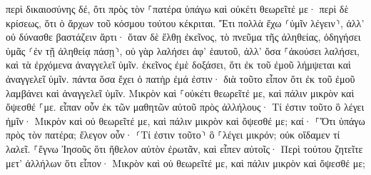 \documentclass{openreader}
\begin{document}
περὶ δικαιοσύνης δέ, ὅτι πρὸς τὸν ⸀πατέρα ὑπάγω καὶ οὐκέτι θεωρεῖτέ με· 
περὶ δὲ κρίσεως, ὅτι ὁ ἄρχων τοῦ κόσμου τούτου κέκριται. 
Ἔτι πολλὰ ἔχω ⸂ὑμῖν λέγειν⸃, ἀλλ’ οὐ δύνασθε βαστάζειν ἄρτι· 
ὅταν δὲ ἔλθῃ ἐκεῖνος, τὸ πνεῦμα τῆς ἀληθείας, ὁδηγήσει ὑμᾶς ⸂ἐν τῇ ἀληθείᾳ πάσῃ⸃, οὐ γὰρ λαλήσει ἀφ’ ἑαυτοῦ, ἀλλ’ ὅσα ⸀ἀκούσει λαλήσει, καὶ τὰ ἐρχόμενα ἀναγγελεῖ ὑμῖν. 
ἐκεῖνος ἐμὲ δοξάσει, ὅτι ἐκ τοῦ ἐμοῦ λήμψεται καὶ ἀναγγελεῖ ὑμῖν. 
πάντα ὅσα ἔχει ὁ πατὴρ ἐμά ἐστιν· διὰ τοῦτο εἶπον ὅτι ἐκ τοῦ ἐμοῦ λαμβάνει καὶ ἀναγγελεῖ ὑμῖν. 
Μικρὸν καὶ ⸀οὐκέτι θεωρεῖτέ με, καὶ πάλιν μικρὸν καὶ ὄψεσθέ ⸀με. 
εἶπαν οὖν ἐκ τῶν μαθητῶν αὐτοῦ πρὸς ἀλλήλους· Τί ἐστιν τοῦτο ὃ λέγει ἡμῖν· Μικρὸν καὶ οὐ θεωρεῖτέ με, καὶ πάλιν μικρὸν καὶ ὄψεσθέ με; καί· ⸀Ὅτι ὑπάγω πρὸς τὸν πατέρα; 
ἔλεγον οὖν· ⸂Τί ἐστιν τοῦτο⸃ ὃ ⸀λέγει μικρόν; οὐκ οἴδαμεν τί λαλεῖ. 
⸀ἔγνω Ἰησοῦς ὅτι ἤθελον αὐτὸν ἐρωτᾶν, καὶ εἶπεν αὐτοῖς· Περὶ τούτου ζητεῖτε μετ’ ἀλλήλων ὅτι εἶπον· Μικρὸν καὶ οὐ θεωρεῖτέ με, καὶ πάλιν μικρὸν καὶ ὄψεσθέ με; 
\end{document}
